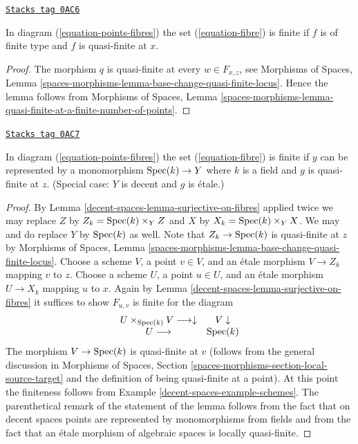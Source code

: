 \begin{lemma}
\label{decent-spaces-lemma-qf-and-qc-finite-fibre}
\href{https://stacks.math.columbia.edu/tag/0AC6}{\texttt{Stacks tag 0AC6}}

In diagram (\ref{equation-points-fibres}) the set (\ref{equation-fibre})
is finite if $f$ is of finite type and $f$ is quasi-finite at $x$.
\end{lemma}

\begin{proof}
The morphism $q$ is quasi-finite at every $w \in F_{x, z}$, see
Morphisms of Spaces, Lemma
\ref{spaces-morphisms-lemma-base-change-quasi-finite-locus}.
Hence the lemma follows from
Morphisms of Spaces, Lemma
\ref{spaces-morphisms-lemma-quasi-finite-at-a-finite-number-of-points}.
\end{proof}

\begin{lemma}
\label{decent-spaces-lemma-decent-finite-fibre}
\href{https://stacks.math.columbia.edu/tag/0AC7}{\texttt{Stacks tag 0AC7}}

In diagram (\ref{equation-points-fibres}) the set (\ref{equation-fibre})
is finite if $y$ can be represented by a monomorphism $\operatorname{Spec}(k) \to Y$
where $k$ is a field and $g$ is quasi-finite at $z$.
(Special case: $Y$ is decent and $g$ is \'etale.)
\end{lemma}

\begin{proof}
By Lemma \ref{decent-spaces-lemma-surjective-on-fibres} applied twice
we may replace $Z$ by $Z_k = \operatorname{Spec}(k) \times_Y Z$ and
$X$ by $X_k = \operatorname{Spec}(k) \times_Y X$. We may and do
replace $Y$ by $\operatorname{Spec}(k)$ as well. Note that $Z_k \to \operatorname{Spec}(k)$
is quasi-finite at $z$ by Morphisms of Spaces, Lemma
\ref{spaces-morphisms-lemma-base-change-quasi-finite-locus}.
Choose a scheme $V$, a point $v \in V$, and an \'etale morphism
$V \to Z_k$ mapping $v$ to $z$. Choose a scheme $U$, a point $u \in U$,
and an \'etale morphism $U \to X_k$ mapping $u$ to $x$.
Again by Lemma \ref{decent-spaces-lemma-surjective-on-fibres}
it suffices to show $F_{u, v}$ is finite for the diagram
$$
\begin{array}{cc}U \times_{\operatorname{Spec}(k)} V \longrightarrow\downarrow & V \downarrow \\ U \longrightarrow & \operatorname{Spec}(k)\end{array}
$$
The morphism $V \to \operatorname{Spec}(k)$ is quasi-finite at $v$
(follows from the general discussion in
Morphisms of Spaces, Section \ref{spaces-morphisms-section-local-source-target}
and the definition of being quasi-finite at a point).
At this point the finiteness follows from Example \ref{decent-spaces-example-schemes}.
The parenthetical remark of the statement of the lemma follows
from the fact that on decent spaces points are represented by
monomorphisms from fields and from the fact that an \'etale
morphism of algebraic spaces is locally quasi-finite.
\end{proof}


